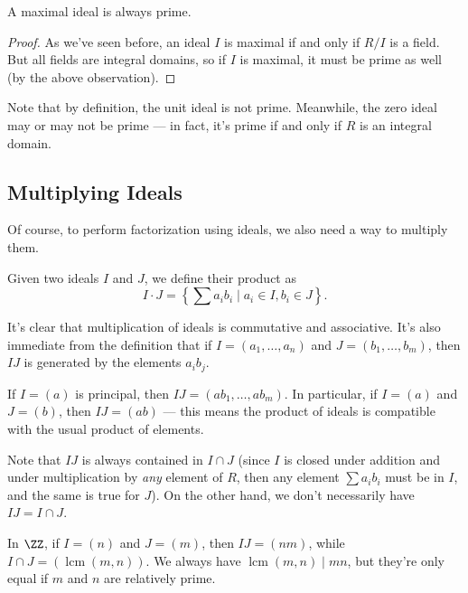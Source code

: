 \begin{lemma}
    A maximal ideal is always prime. 
\end{lemma}

\begin{proof}
    As we've seen before, an ideal $I$ is maximal if and only if $R/I$ is a field. But all fields are integral domains, so if $I$ is maximal, it must be prime as well (by the above observation). 
\end{proof}

Note that by definition, the unit ideal is not prime. Meanwhile, the zero ideal may or may not be prime --- in fact, it's prime if and only if $R$ is an integral domain. 

\subsection{Multiplying Ideals}

Of course, to perform factorization using ideals, we also need a way to multiply them.  

\begin{definition}
    Given two ideals $I$ and $J$, we define their product as \[I\cdot J = \left\{\sum a_ib_i \mid a_i \in I, b_i \in J\right\}.\] 
\end{definition}

It's clear that multiplication of ideals is commutative and associative. It's also immediate from the definition that if $I = (a_1, \ldots, a_n)$ and $J = (b_1, \ldots, b_m)$, then $IJ$ is generated by the elements $a_ib_j$. 

\begin{example}
    If $I = (a)$ is principal, then $IJ = (ab_1, \ldots, ab_m)$. In particular, if $I = (a)$ and $J = (b)$, then $IJ = (ab)$ --- this means the product of ideals is compatible with the usual product of elements. 
\end{example}

Note that $IJ$ is always contained in $I \cap J$ (since $I$ is closed under addition and under multiplication by \emph{any} element of $R$, then any element $\sum a_ib_i$ must be in $I$, and the same is true for $J$). On the other hand, we don't necessarily have $IJ = I \cap J$. 

\begin{example}
    In $\ZZ$, if $I = (n)$ and $J = (m)$, then $IJ = (nm)$, while $I \cap J = (\operatorname{lcm}(m, n))$. We always have $\operatorname{lcm}(m, n) \mid mn$, but they're only equal if $m$ and $n$ are relatively prime. 
\end{example}

